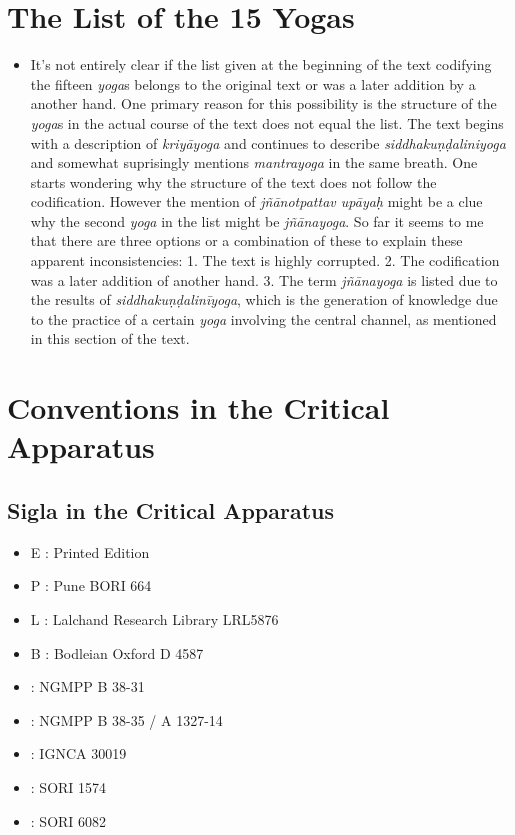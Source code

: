 \parindent=15pt

\maketitle
\clearpage
\tableofcontents
\addtocounter{page}{-1}
\thispagestyle{empty}
\clearpage


\chapter{The List of the 15 Yogas}
\begin{itemize}
\item It's not entirely clear if the list given at the beginning of the text codifying the fifteen \textit{yoga}s belongs to the original text or was a later addition by a another hand. One primary reason for this possibility is the structure of the \textit{yoga}s in the actual course of the text does not equal the list. The text begins with a description of \textit{kriyāyoga} and continues to describe \textit{siddhakuṇḍaliniyoga} and somewhat suprisingly mentions \textit{mantrayoga} in the same breath. One starts wondering why the structure of the text does not follow the codification. However the mention of \textit{jñānotpattav upāyaḥ} might be a clue why the second \textit{yoga} in the list might be \textit{jñānayoga}. So far it seems to me that there are three options or a combination of these to explain these apparent inconsistencies: 1. The text is highly corrupted. 2. The codification was a later addition of another hand. 3. The term \textit{jñānayoga} is listed due to the results of \textit{siddhakuṇḍalinīyoga}, which is the generation of knowledge due to the practice of a certain \textit{yoga} involving the central channel, as mentioned in this section of the text.
\end{itemize}

\chapter{Conventions in the Critical Apparatus}
\section{Sigla in the Critical Apparatus}

\begin{itemize}
\item E : Printed Edition
\item P : Pune BORI 664
\item L : Lalchand Research Library LRL5876
\item B : Bodleian Oxford D 4587
\item \None : NGMPP B 38-31
\item \Ntwo : NGMPP B 38-35 / A 1327-14
\item \Done : IGNCA 30019
\item \Uone : SORI 1574
\item \Utwo: SORI 6082
\end{itemize}

